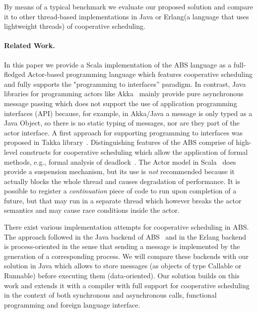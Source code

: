 By means of a typical benchmark we evaluate our proposed solution and compare it
to other thread-based implementations in Java or Erlang(a language that uses lightweight threads) of cooperative scheduling.


\paragraph{Related Work.} 
In this paper we provide a Scala implementation of the ABS language as a full-fledged Actor-based programming language which features cooperative scheduling and fully supports the "programming to interfaces'' paradigm. 
In contrast, Java libraries for programming actors like Akka~\cite{Akka} mainly provide pure asynchronous message passing which does not support the use of application programming interfaces (API) because, for example, in Akka/Java a message is only typed as a Java Object, so there is no static typing of messages, nor are they part of the actor interface.  A first approach for supporting programming to interfaces was proposed in Takka library~\cite{takka}. 
Distinguishing features of the ABS comprise of high-level constructs for cooperative scheduling which allow the application of formal methods, e.g.,
formal analysis of deadlock~\cite{deadlock}.
The Actor model in Scala~\cite{Scala} does provide a suspension mechanism, but its use is \emph{not} recommended because it actually blocks the whole thread and causes
degradation of performance.
It is possible to register a {\em continuation} piece of code to run upon completion of a future, but that may run in a separate thread which however breaks the actor semantics and may cause race conditions inside the actor.

There exist various implementation attempts for cooperative scheduling in ABS. 
The approach followed in the Java backend of ABS~\cite{abs,Schafer} and in the Erlang backend~\cite{Erlang} is process-oriented in the sense that sending a message is implemented by the generation of a corresponding process. We will compare these backends with our solution in Java which allows to store messages (as objects of type Callable or Runnable) before executing them (data-oriented). Our solution builds on this work and extends it with a compiler with full support for cooperative scheduling in the context of both synchronous and asynchronous calls, functional programming and foreign language interface. 

